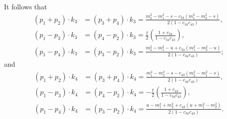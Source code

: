 It follows that
\begin{align}
	\left(p_{1} + p_{2} \right) \cdot k_{3} &= \left(p_{3} + p_{4} \right) \cdot k_{3} = \frac{m_{2}^{2} - m_{1}^{2} - s - c_{34} \left( m_{1}^{2} - m_{2}^{2} - s \right) }{2 \left( 1 - c_{34} c_{43} \right)}, \\
	\left(p_{1} - p_{3} \right) \cdot k_{3} &= \left(p_{4} - p_{2} \right) \cdot k_{3} = \frac{t}{2} \left( \frac{1 + c_{34}}{ 1 - c_{34} c_{43} } \right), \\
	\left(p_{1} - p_{4} \right) \cdot k_{3} &= \left(p_{3} - p_{2} \right) \cdot k_{3} = \frac{m_{2}^{2} - m_{1}^{2} - u + c_{34} \left( m_{1}^{2} - m_{2}^{2} - u \right) }{2 \left( 1 - c_{34} c_{43} \right)};
\end{align}
and
\begin{align}
	\left(p_{1} + p_{2} \right) \cdot k_{4} &= \left(p_{3} + p_{4} \right) \cdot k_{4} = \frac{m_{1}^{2} - m_{2}^{2} - s - c_{43} \left( m_{2}^{2} - m_{1}^{2} - s \right) }{2 \left( 1 - c_{34} c_{43} \right)}, \\
	\left(p_{1} - p_{3} \right) \cdot k_{4} &= \left(p_{4} - p_{2} \right) \cdot k_{4} = -\frac{t}{2} \left( \frac{1 + c_{43}}{ 1 - c_{34} c_{43} } \right), \\
	\left(p_{1} - p_{4} \right) \cdot k_{4} &= \left(p_{3} - p_{2} \right) \cdot k_{4} = \frac{u - m_{1}^{2} + m_{2}^{2} + c_{43} \left( u + m_{1}^{2} - m_{2}^{2} \right) }{2 \left( 1 - c_{34} c_{43} \right)}.
\end{align}